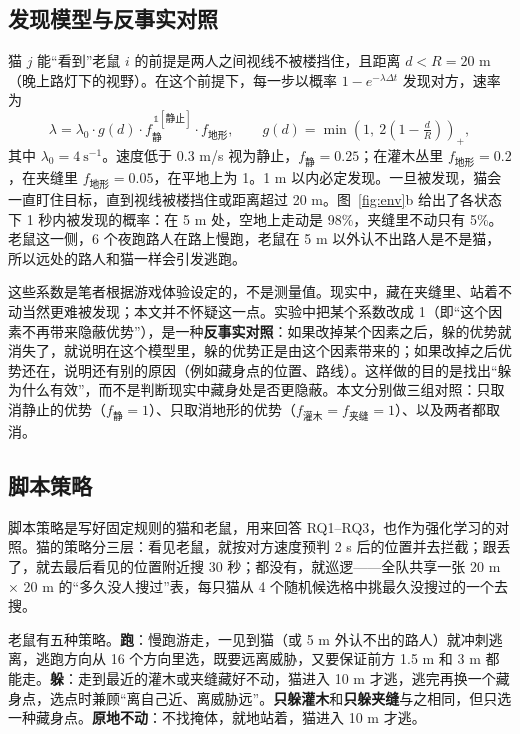 \subsection{发现模型与反事实对照}
\label{sec:detect}
猫 $j$ 能“看到”老鼠 $i$ 的前提是两人之间视线不被楼挡住，且距离 $d<R=20$ m（晚上路灯下的视野）。在这个前提下，每一步以概率 $1-e^{-\lambda\Delta t}$ 发现对方，速率为
\begin{equation}
\lambda = \lambda_0 \cdot g(d) \cdot f_{\text{静}}^{\,\mathbb{1}[\text{静止}]} \cdot f_{\text{地形}}, \qquad
g(d)=\min\!\left(1,\ 2\left(1-\tfrac{d}{R}\right)\right)_{+},
\end{equation}
其中 $\lambda_0=4\ \text{s}^{-1}$。速度低于 0.3 m/s 视为静止，$f_{\text{静}}=0.25$；在灌木丛里 $f_{\text{地形}}=0.2$，在夹缝里 $f_{\text{地形}}=0.05$，在平地上为 1。1 m 以内必定发现。一旦被发现，猫会一直盯住目标，直到视线被楼挡住或距离超过 20 m。图~\ref{fig:env}b 给出了各状态下 1 秒内被发现的概率：在 5 m 处，空地上走动是 98\%，夹缝里不动只有 5\%。老鼠这一侧，6 个夜跑路人在路上慢跑，老鼠在 5 m 以外认不出路人是不是猫，所以远处的路人和猫一样会引发逃跑。

这些系数是笔者根据游戏体验设定的，不是测量值。现实中，藏在夹缝里、站着不动当然更难被发现；本文并不怀疑这一点。实验中把某个系数改成 1（即“这个因素不再带来隐蔽优势”），是一种\textbf{反事实对照}：如果改掉某个因素之后，躲的优势就消失了，就说明在这个模型里，躲的优势正是由这个因素带来的；如果改掉之后优势还在，说明还有别的原因（例如藏身点的位置、路线）。这样做的目的是找出“躲为什么有效”，而不是判断现实中藏身处是否更隐蔽。本文分别做三组对照：只取消静止的优势（$f_{\text{静}}=1$）、只取消地形的优势（$f_{\text{灌木}}=f_{\text{夹缝}}=1$）、以及两者都取消。

\subsection{脚本策略}
\label{sec:script}
脚本策略是写好固定规则的猫和老鼠，用来回答 RQ1–RQ3，也作为强化学习的对照。猫的策略分三层：看见老鼠，就按对方速度预判 2 s 后的位置并去拦截；跟丢了，就去最后看见的位置附近搜 30 秒；都没有，就巡逻——全队共享一张 20 m × 20 m 的“多久没人搜过”表，每只猫从 4 个随机候选格中挑最久没搜过的一个去搜。

老鼠有五种策略。\textbf{跑}：慢跑游走，一见到猫（或 5 m 外认不出的路人）就冲刺逃离，逃跑方向从 16 个方向里选，既要远离威胁，又要保证前方 1.5 m 和 3 m 都能走。\textbf{躲}：走到最近的灌木或夹缝藏好不动，猫进入 10 m 才逃，逃完再换一个藏身点，选点时兼顾“离自己近、离威胁远”。\textbf{只躲灌木}和\textbf{只躲夹缝}与之相同，但只选一种藏身点。\textbf{原地不动}：不找掩体，就地站着，猫进入 10 m 才逃。

